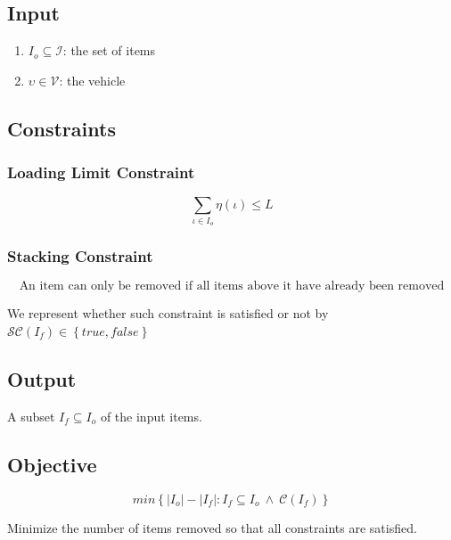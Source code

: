 \documentclass{article}
\newcommand{\true}{\ensuremath{true}\xspace}
\newcommand{\false}{\ensuremath{false}\xspace}
\newcommand{\abs}[1]{\ensuremath{\left| #1 \right|}\xspace}
\newcommand{\Set}[1]{\ensuremath{\left\{#1\right\}}}
\newcommand{\SetOf}[2]{\ensuremath{\left\{ #1 : #2 \right\}}\xspace}
\newcommand{\vehicleO}{\ensuremath{\upsilon}\xspace}
\newcommand{\vehicleSet}{\mathcal{V}\xspace}
\newcommand{\loadingFunction}{\ensuremath{\eta}\xspace}
\newcommand{\loadingFunctionApply}[1]{\loadingFunction \left( #1 \right)\xspace}
\newcommand{\loadingLimit}{\ensuremath{L}\xspace}
\newcommand{\itemO}{\ensuremath{\iota}\xspace}
\newcommand{\itemSet}{\ensuremath{\mathcal{I}}\xspace}
\newcommand{\itemInput}{\ensuremath{\mathit{I}_{o}}\xspace}
\newcommand{\itemOutput}{\ensuremath{\mathit{I}_{f}}\xspace}
\newcommand{\stackingPredicateSymbol}{\ensuremath{\mathcal{SC}}\xspace}
\newcommand{\stackingPredicate}[1]{\ensuremath{\stackingPredicateSymbol \left( #1 \right)}\xspace}
\newcommand{\vehicleInput}{\vehicleO}
\newcommand{\constraintsPredicateSymbol}{\ensuremath{\mathscr{C}}\xspace}
\newcommand{\constraintsPredicate}[1]{\ensuremath{\constraintsPredicateSymbol \left( #1 \right)}\xspace}
\begin{document}
\subsection{Input}

\begin{enumerate}
	\item $\itemInput \subseteq \itemSet$: the set of items
	\item $\vehicleInput \in \vehicleSet$: the vehicle
\end{enumerate}

\subsection{Constraints}

\subsubsection*{Loading Limit Constraint}
\begin{equation}
	\label{constraint:loading-limit}
	\displaystyle\sum\limits_{\itemO \in \itemInput}
		\loadingFunctionApply{\itemO}
		\leq \loadingLimit
\end{equation}

\subsubsection*{Stacking Constraint}
\begin{equation}
	\label{constraint:stacking}
	\mbox{An item can only be removed if all items above it have already been removed}
\end{equation}

We represent whether such constraint is satisfied or not by $\stackingPredicate{\itemOutput} \in \Set{\true, \false}$

\subsection{Output}

A subset $\itemOutput \subseteq \itemInput$ of the input items.

\subsection{Objective}

\begin{equation}
	min\SetOf{\abs{\itemInput} - \abs{\itemOutput}}{\itemOutput \subseteq \itemInput \ \land \ \constraintsPredicate{\itemOutput}}
\end{equation}

Minimize the number of items removed so that all constraints are satisfied.



\end{document}

